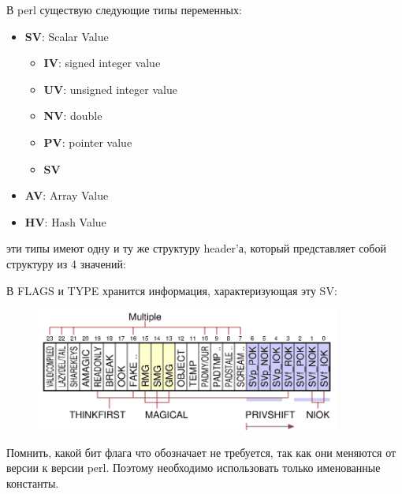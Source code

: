 В perl существую следующие типы переменных:
\begin{itemize}[nosep]
  \item \textbf{SV}: Scalar Value
  \begin{itemize}[nosep]
    \item \textbf{IV}: signed integer value
    \item \textbf{UV}: unsigned integer value
    \item \textbf{NV}: double
    \item \textbf{PV}: pointer value
    \item \textbf{SV}
  \end{itemize}
  \item \textbf{AV}: Array Value
  \item \textbf{HV}: Hash Value
\end{itemize}
эти типы имеют одну и ту же структуру header'а, который представляет собой структуру из 4 значений:
\begin{figure}[H] \centering
{}
\end{figure}\noindent
В FLAGS и TYPE хранится информация, характеризующая эту SV:
\begin{figure}[H] \centering
  \includegraphics[width=10cm]{lectures/L10/flags.png}
\end{figure}\noindent
Помнить, какой бит флага что обозначает не требуется, так как они меняются от версии к версии perl. Поэтому необходимо использовать только именованные константы.

